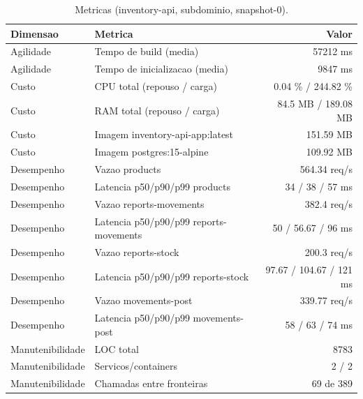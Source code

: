 \begin{table}[htb]
  \centering
  \caption{Metricas (inventory-api, subdominio, snapshot-0).}
  \label{tab:metricas-inventory-api-subdominio-snapshot-0}
  \begin{tabular}{llr}
    \hline
    \textbf{Dimensao} & \textbf{Metrica} & \textbf{Valor} \\
    \hline
    Agilidade & Tempo de build (media) & 57212 ms \\
    Agilidade & Tempo de inicializacao (media) & 9847 ms \\
    Custo & CPU total (repouso / carga) & 0.04 \% / 244.82 \% \\
    Custo & RAM total (repouso / carga) & 84.5 MB / 189.08 MB \\
    Custo & Imagem inventory-api-app:latest & 151.59 MB \\
    Custo & Imagem postgres:15-alpine & 109.92 MB \\
    Desempenho & Vazao products & 564.34 req/s \\
    Desempenho & Latencia p50/p90/p99 products & 34 / 38 / 57 ms \\
    Desempenho & Vazao reports-movements & 382.4 req/s \\
    Desempenho & Latencia p50/p90/p99 reports-movements & 50 / 56.67 / 96 ms \\
    Desempenho & Vazao reports-stock & 200.3 req/s \\
    Desempenho & Latencia p50/p90/p99 reports-stock & 97.67 / 104.67 / 121 ms \\
    Desempenho & Vazao movements-post & 339.77 req/s \\
    Desempenho & Latencia p50/p90/p99 movements-post & 58 / 63 / 74 ms \\
    Manutenibilidade & LOC total & 8783 \\
    Manutenibilidade & Servicos/containers & 2 / 2 \\
    Manutenibilidade & Chamadas entre fronteiras & 69 de 389 \\
    \hline
  \end{tabular}
\end{table}
